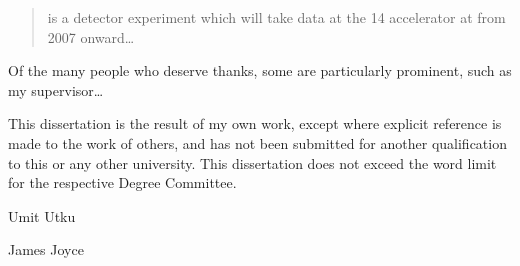
\begin{abstract}%
  \LHCb is a \bphysics detector experiment which will take data at
  the \unit{14}{\TeV} \LHC accelerator at \CERN from 2007 onward\dots
\end{abstract}

\begin{acknowledgements}
  Of the many people who deserve thanks, some are particularly prominent,
  such as my supervisor\dots
\end{acknowledgements}

\begin{declaration}
  This dissertation is the result of my own work, except where explicit
  reference is made to the work of others, and has not been submitted
  for another qualification to this or any other university. This
  dissertation does not exceed the word limit for the respective Degree
  Committee.
  \vspace*{1cm}
  \begin{flushright}
    Umit Utku
  \end{flushright}
\end{declaration}

\tableofcontents

\listoffigures
\listoftables

%
  {James Joyce}
\thispagestyle{empty}
